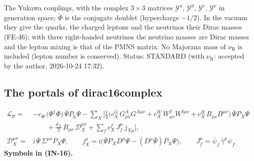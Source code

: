 \documentclass[
  10pt,
]{article}
\begin{document}
The Yukawa couplings, with the complex \(3 \times 3\) matrices
\(\mathcal{Y}^{u}\), \(\mathcal{Y}^{d}\), \(\mathcal{Y}^{e}\),
\(\mathcal{Y}^{\nu}\) in generation space; \(\tilde\Phi\) is the
conjugate doublet (hypercharge \(-1/2\)). In the vacuum they give the
quarks, the charged leptons and the neutrinos their Dirac masses
(FE-46); with three right-handed neutrinos the neutrino masses are Dirac
masses and the lepton mixing is that of the PMNS matrix. No Majorana
mass of \(\nu_{\mathrm{R}}\) is included (lepton number is conserved).
Status: STANDARD (with \(\nu_{\mathrm{R}}\): accepted by the author,
2026-10-24 17:32).

\hypertarget{the-portals-of-dirac16complex}{%
\subsection{The portals of
dirac16complex}\label{the-portals-of-dirac16complex}}

\[
\begin{aligned}
\mathcal{L}_{\mathrm{P}} = {}&-c_\Phi\,\big(\Phi^\dagger\Phi\big)\,\bar\Psi P_{\mathrm{L}}\Psi
 - \sum_{X}\Big[\frac14\big(c^{G}_X\,G^A_{\mu\nu}G^{A\mu\nu} + c^{W}_X\,W^I_{\mu\nu}W^{I\mu\nu}
 + c^{B}_X\,B_{\mu\nu}B^{\mu\nu}\big)\,\bar\Psi P_X\Psi\\
&\qquad + \frac{d_X}{2}\,B_{\mu\nu}\,\mathcal{D}_X^{\mu\nu} + \sum_{f} c^{f}_X\,J_f^\mu\,j_{X\mu}\Big],\\
\mathcal{D}_X^{\mu\nu} = {}&\mathrm{i}\,\bar\Psi\,\Sigma^{\mu\nu}P_X\Psi,\qquad
j_X^\mu = \mathrm{i}\big(\bar\Psi P_X D^\mu\Psi - (D^\mu\bar\Psi)P_X\Psi\big),\qquad
J_f^\mu = \bar\psi_f\,\hat\gamma^\mu\psi_f
\end{aligned} \tag{IN-16}
\] \textbf{Symbols in (IN-16).}
\end{document}
